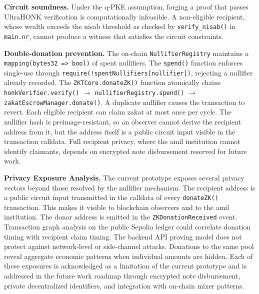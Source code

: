 \documentclass[conference]{IEEEtran}
\begin{document}
\textbf{Circuit soundness.} Under the q-PKE assumption\cite{b_zkp_blockchain}, forging a proof that passes UltraHONK verification is computationally infeasible\cite{b_zkp_vuln}\cite{b_aztec}. A non-eligible recipient, whose wealth exceeds the nisab threshold as checked by \texttt{verify\_nisab()} in \texttt{main.nr}, cannot produce a witness that satisfies the circuit constraints\cite{b_noir}\cite{b_zkp_circuits}.

\textbf{Double-donation prevention.} The on-chain \texttt{NullifierRegistry} maintains a \texttt{mapping(bytes32 => bool)} of spent nullifiers\cite{b_aztec}\cite{b_zkp_blockchain}. The \texttt{spend()} function enforces single-use through \texttt{require(!spentNullifiers[nullifier])}, rejecting a nullifier already recorded\cite{b_zkp_vuln}. The \texttt{ZKTCore.donateZK()} function atomically chains \texttt{honkVerifier.verify()} $\rightarrow$ \texttt{nullifierRegistry.spend()} $\rightarrow$ \texttt{zakatEscrowManager.donate()}\cite{b_zkp_financial}\cite{b_rbac_sc}. A duplicate nullifier causes the transaction to revert\cite{b_aztec}. Each eligible recipient can claim zakat at most once per cycle\cite{b_maqasid_data}\cite{b_maqasid_privacy}. The nullifier hash is preimage-resistant, so an observer cannot derive the recipient address from it\cite{b_poseidon}\cite{b_zkp_blockchain}, but the address itself is a public circuit input visible in the transaction calldata\cite{b_zkp_vuln}. Full recipient privacy, where the amil institution cannot identify claimants, depends on encrypted note disbursement reserved for future work\cite{b_bbs_w3c}.

\noindent\textbf{Privacy Exposure Analysis.} The current prototype exposes several privacy vectors beyond those resolved by the nullifier mechanism\cite{b_mixer_analysis}\cite{b_zkp_vuln}. The recipient address is a public circuit input transmitted in the calldata of every \texttt{donateZK()} transaction\cite{b_zkp_circuits}\cite{b_zkfi}. This makes it visible to blockchain observers and to the amil institution\cite{b_maqasid_privacy}. The donor address is emitted in the \texttt{ZKDonationReceived} event\cite{b_zkfi}. Transaction graph analysis on the public Sepolia ledger could correlate donation timing with recipient claim timing\cite{b_mixer_analysis}. The backend API proving model does not protect against network-level or side-channel attacks\cite{b_zkp_vuln}. Donations to the same pool reveal aggregate economic patterns when individual amounts are hidden\cite{b_zkp_financial}. Each of these exposures is acknowledged as a limitation of the current prototype and is addressed in the future work roadmap through encrypted note disbursement\cite{b_bbs_w3c}, private decentralized identifiers\cite{b_zkp_idm}, and integration with on-chain mixer patterns\cite{b_mixer_analysis}.
\end{document}
